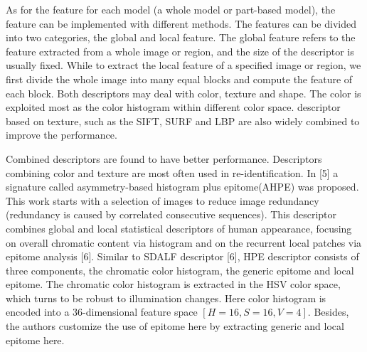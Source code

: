 As for the feature for each model (a whole model or part-based model), the feature can be implemented with different methods. The features can be divided into two categories, the global and local feature. The global feature refers to the feature extracted from a whole image or region, and the size of the descriptor is usually fixed. While to extract the local feature of a specified image or region, we first divide the whole image into many equal blocks and compute the feature of each block.  Both descriptors may deal with color, texture and shape. The color is exploited most as the color histogram within different color space. descriptor based on texture, such as the SIFT, SURF and LBP are also widely combined to improve the performance.
 
Combined descriptors are found to have better performance. Descriptors combining color and texture are most often used in re-identification. In [5] a signature called asymmetry-based histogram plus epitome(AHPE) was proposed. This work starts with a selection of images to reduce image redundancy (redundancy is caused by correlated consecutive sequences). This descriptor combines global and local statistical descriptors of human appearance, focusing on overall chromatic content via histogram and on the recurrent local patches via epitome analysis [6]. Similar to SDALF descriptor [6], HPE descriptor consists of three components, the chromatic color histogram, the generic epitome and local epitome. The chromatic color histogram is extracted in the HSV color space, which turns to be robust to illumination changes. Here color histogram is encoded into a 36-dimensional feature space $[H=16,  S=16,  V=4]$. Besides, the authors customize the use of epitome here by extracting generic and local epitome here. 

